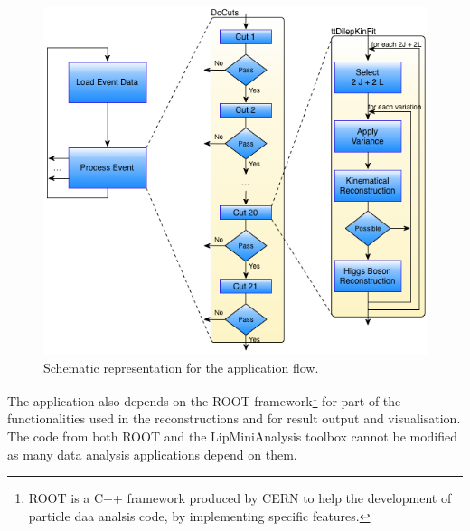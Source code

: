\begin{figure}[!htp]
	\begin{center}
		\includegraphics[scale=0.5]{images/graf_abstract_flow_with_kinfit.png}
		\caption{Schematic representation for the \tth application flow.}
		\label{fig:flow}
	\end{center}
\end{figure}

The application also depends on the ROOT framework\footnote{ROOT\cite{ROOT} is a C++ framework produced by CERN  to help the development of particle daa analsis code, by implementing specific features.} for part of the functionalities used in the reconstructions and for result output and visualisation. The code from both ROOT and the LipMiniAnalysis toolbox cannot be modified as many data analysis applications depend on them.
